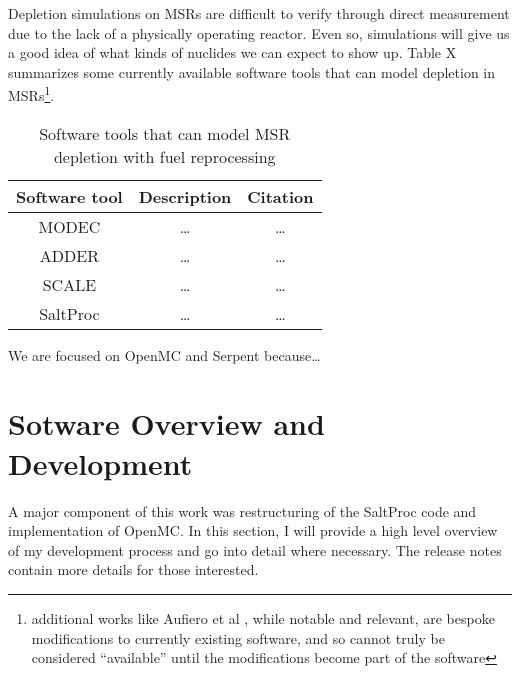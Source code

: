 Depletion simulations on \Gls{MSR}s are difficult to verify through direct measurement due to the lack of a physically operating reactor. Even so, simulations will give us a good idea of what kinds of nuclides we can expect to show up. Table X summarizes some currently available software tools that can model depletion in \Gls{MSR}s\footnote{additional works like Aufiero et al \cite{aufiero_extended_2013}, while notable and relevant, are bespoke modifications to currently existing software, and
so cannot truly be considered ``available'' until the modifications become part of the software}.

 
\begin{table}[htpb]
    \centering
    \caption{Software tools that can model \Gls{MSR} depletion with fuel reprocessing}
    \label{tab:msr-depletion-tools}
    \begin{tabular}{|c|c|c|}
        \hline
        Software tool & Description & Citation\\
        \hline
        MODEC & \ldots & \ldots\\
        \hline
        ADDER & \ldots & \ldots\\
        \hline
        SCALE & \ldots & \ldots\\
        \hline
        SaltProc & \ldots & \ldots\\
        \hline
         
    \end{tabular}
\end{table}




We are focused on OpenMC and Serpent because\ldots


\section{Sotware Overview and Development}
\label{sec:soft_dev}
A major component of this work was restructuring of the SaltProc code and implementation of OpenMC. In this section, I will provide a high level overview of my development process and go into detail where necessary. The release notes contain more details for those interested.
